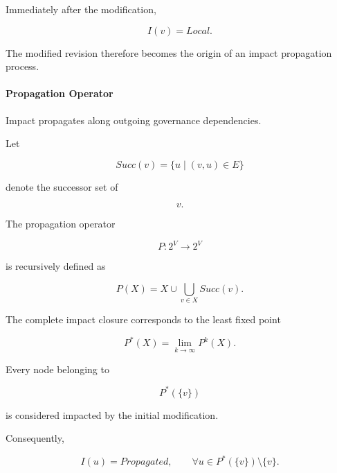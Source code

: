 \documentclass[10pt]{article}
\begin{document}
Immediately after the modification,

\[
I(v)=Local.
\]

The modified revision therefore becomes the origin of an impact propagation
process.

\paragraph{Propagation Operator}

Impact propagates along outgoing governance dependencies.

Let

\begin{equation}
Succ(v)
=
\{
u
\mid
(v,u)\in E
\}
\label{eq:app_prop_op1}
\end{equation}

denote the successor set of

\[
v.
\]

The propagation operator

\begin{equation}
P
:
2^V
\rightarrow
2^V
\label{eq:app_prop_op2}
\end{equation}

is recursively defined as

\begin{equation}
P(X)
=
X
\cup
\bigcup_{v\in X}
Succ(v).
\label{eq:app_prop_op3}
\end{equation}

The complete impact closure corresponds to the least fixed point

\begin{equation}
P^\ast(X)
=
\lim_{k\rightarrow\infty}
P^{k}(X).
\label{eq:app_prop_op3}
\end{equation}

Every node belonging to

\begin{equation}
P^\ast(\{v\})
\label{eq:app_prop_op4}
\end{equation}

is considered impacted by the initial modification.

Consequently,

\begin{equation}
I(u)=Propagated,
\qquad
\forall
u
\in
P^\ast(\{v\})
\setminus
\{v\}.
\label{eq:app_prop_op5}
\end{equation}

\end{document}
